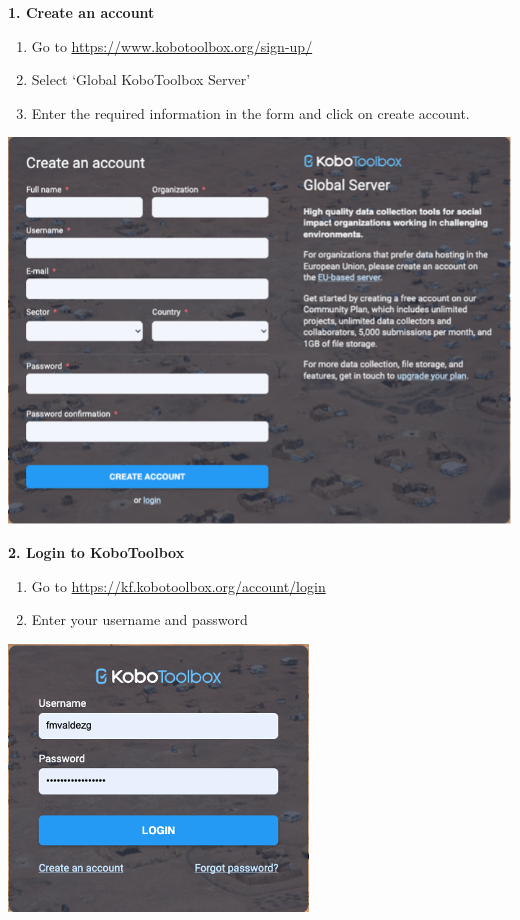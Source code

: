 \documentclass[
  letterpaper,
  DIV=11,
  numbers=noendperiod]{scrartcl}
\begin{document}
\textbf{1. Create an account}

\begin{enumerate}
\def\labelenumi{\arabic{enumi}.}
\item
  Go to \url{https://www.kobotoolbox.org/sign-up/}
\item
  Select `Global KoboToolbox Server'
\item
  Enter the required information in the form and click on create
  account.
\end{enumerate}

\includegraphics{kobotoolbox_tutorial_files/img/img1.png}

\textbf{2. Login to KoboToolbox}

\begin{enumerate}
\def\labelenumi{\arabic{enumi}.}
\item
  Go to \url{https://kf.kobotoolbox.org/account/login}
\item
  Enter your username and password
\end{enumerate}

\includegraphics{kobotoolbox_tutorial_files/img/img2.png}
\end{document}
